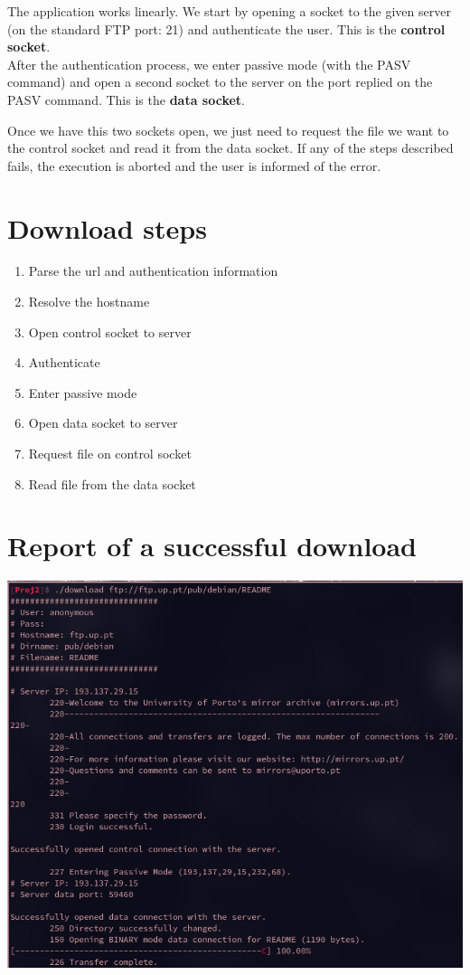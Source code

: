 \documentclass[11pt]{report}
\begin{document}
The application works linearly. We start by opening a socket to the given
server (on the standard FTP port: 21) and authenticate the user. This is
the \textbf{control socket}.\\
After the authentication process, we enter passive mode (with the PASV
command) and open a second socket to the server on the port replied on
the PASV command. This is the \textbf{data socket}.

Once we have this two sockets open, we just need to request the file
we want to the control socket and read it from the data socket. If any
of the steps described fails, the execution is aborted and the user is
informed of the error.

\section{Download steps}
\begin{enumerate}
\item Parse the url and authentication information
\item Resolve the hostname
\item Open control socket to server
\item Authenticate
\item Enter passive mode
\item Open data socket to server
\item Request file on control socket
\item Read file from the data socket
\end{enumerate}

\section{Report of a successful download}

\includegraphics[width=1\textwidth]{images/download_report.png}
\end{document}
